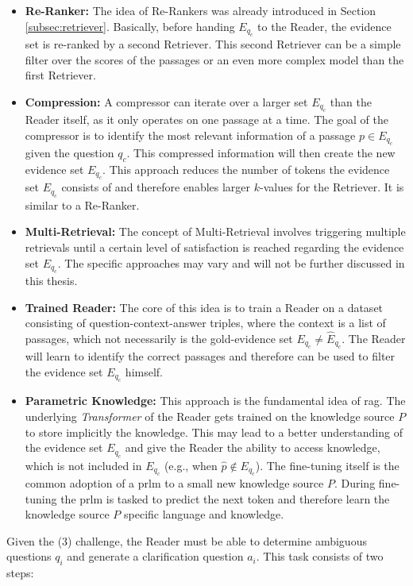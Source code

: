 \begin{itemize}
    \item \textbf{Re-Ranker:} The idea of Re-Rankers was already introduced in Section \ref{subsec:retriever}. Basically, before handing $E_{q_c}$ to the Reader, the evidence set is re-ranked by a second Retriever. This second Retriever can be a simple filter over the scores of the passages or an even more complex model than the first Retriever.
    \item \textbf{Compression:} A compressor can iterate over a larger set $E_{q_c}$ than the Reader itself, as it only operates on one passage at a time. The goal of the compressor is to identify the most relevant information of a passage $p \in E_{q_c}$ given the question $q_c$. This compressed information will then create the new evidence set $E_{q_c}$. This approach reduces the number of tokens the evidence set $E_{q_c}$ consists of and therefore enables larger $k$-values for the Retriever. It is similar to a Re-Ranker.
    \item \textbf{Multi-Retrieval:} The concept of Multi-Retrieval involves triggering multiple retrievals until a certain level of satisfaction is reached regarding the evidence set $E_{q_c}$. The specific approaches may vary and will not be further discussed in this thesis.
    \item \textbf{Trained Reader:} The core of this idea is to train a Reader on a dataset consisting of question-context-answer triples, where the context is a list of passages, which not necessarily is the gold-evidence set $E_{q_c} \not= \hat{E}_{q_c}$. The Reader will learn to identify the correct passages and therefore can be used to filter the evidence set $E_{q_c}$ himself. 
    \item \textbf{Parametric Knowledge:} This approach is the fundamental idea of \gls{rag}. The underlying \textit{Transformer} of the Reader gets trained on the knowledge source $P$ to store implicitly the knowledge. This may lead to a better understanding of the evidence set $E_{q_c}$ and give the Reader the ability to access knowledge, which is not included in $E_{q_c}$ (e.g., when $\hat{p} \not\in E_{q_c}$). The fine-tuning itself is the common adoption of a \gls{prlm} to a small new knowledge source $P$. During fine-tuning the \gls{prlm} is tasked to predict the next token and therefore learn the knowledge source $P$ specific language and knowledge.
\end{itemize}

Given the (3) challenge, the Reader must be able to determine ambiguous questions $q_{i}$ and generate a clarification question $a_i$. This task consists of two steps:

